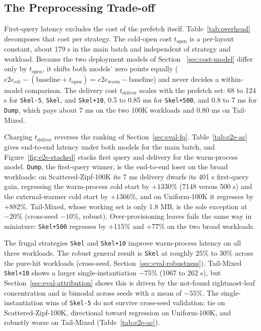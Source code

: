 \documentclass[sigconf, nonacm]{acmart}
\begin{document}
\subsection{The Preprocessing Trade-off}\label{sec:eval-tradeoff}

First-query latency excludes the cost of the prefetch itself. Table~\ref{tab:overhead} decomposes that cost per strategy. The cold-open cost $t_\text{open}$ is a per-layout constant, about 179 \textmu s in the main batch and independent of strategy and workload. Because the two deployment models of Section ~\ref{sec:cost-model} differ only by $t_{\text{open}}$, it shifts both models' zero points equally ($e2e_{\text{ext}} - (\text{baseline} + t_{\text{open}}) = e2e_{\text{warm}} - \text{baseline}$) and never decides a within-model comparison. The delivery cost $t_\text{deliver}$ scales with the prefetch set: 68 to 124 \textmu s for \texttt{Skel-5}, \texttt{Skel}, and \texttt{Skel+10}, 0.5 to 0.85 ms for \texttt{Skel+500}, and 0.8 to 7 ms for \texttt{Dump}, which pays about 7 ms on the two 100K workloads and 0.80 ms on Tail-Mixed.

Charging $t_\text{deliver}$ reverses the ranking of Section~\ref{sec:eval-fq}. Table~\ref{tab:e2e-ac} gives end-to-end latency under both models for the main batch, and Figure~\ref{fig:e2e-stacked} stacks first query and delivery for the warm-process model. \texttt{Dump}, the first-query winner, is the end-to-end loser on the broad workloads: on Scattered-Zipf-100K its 7 ms delivery dwarfs its 401 \textmu s first-query gain, regressing the warm-process cold start by $+1330\%$ (7148 versus 500 \textmu s) and the external-warmer cold start by $+1366\%$, and on Uniform-100K it regresses by $+882\%$. Tail-Mixed, whose working set is only 1.8 MB, is the sole exception at $-20\%$ (cross-seed $-10\%$, robust). Over-provisioning leaves fails the same way in miniature: \texttt{Skel+500} regresses by $+115\%$ and $+77\%$ on the two broad workloads.

The frugal strategies \texttt{Skel} and \texttt{Skel+10} improve warm-process latency on all three workloads. The robust general result is \texttt{Skel} at roughly $25\%$ to $30\%$ across the pure-hit workloads (cross-seed, Section~\ref{sec:eval-robustness}). Tail-Mixed \texttt{Skel+10} shows a larger single-instantiation $-75\%$ (1067 to 262 \textmu s), but Section~\ref{sec:eval-attribution} shows this is driven by the not-found rightmost-leaf concentration and is bimodal across seeds with a mean of $-55\%$. The single-instantiation wins of \texttt{Skel-5} do not survive cross-seed validation: tie on Scattered-Zipf-100K, directional toward regression on Uniform-100K, and robustly worse on Tail-Mixed (Table~\ref{tab:e2e-ac}).
\end{document}
